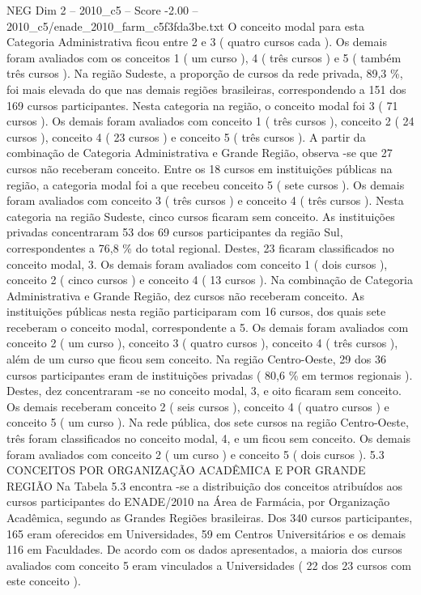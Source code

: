 \begin{textsample}{NEG Dim 2 – 2010\_c5 – Score -2.00 – 2010\_c5/enade\_2010\_farm\_c5f3fda3be.txt}
O conceito modal para esta Categoria Administrativa ficou entre 2 e 3 ( quatro cursos cada ).
Os demais foram avaliados com os conceitos 1 ( um curso ), 4 ( três cursos ) e 5 ( também três cursos ).
Na região Sudeste, a proporção de cursos da rede privada, 89,3 \%, foi mais elevada do que nas demais regiões brasileiras, correspondendo a 151 dos 169 cursos participantes.
Nesta categoria na região, o conceito modal foi 3 ( 71 cursos ).
Os demais foram avaliados com conceito 1 ( três cursos ), conceito 2 ( 24 cursos ), conceito 4 ( 23 cursos ) e conceito 5 ( três cursos ).
A partir da combinação de Categoria Administrativa e Grande Região, observa -se que 27 cursos não receberam conceito.
Entre os 18 cursos em instituições públicas na região, a categoria modal foi a que recebeu conceito 5 ( sete cursos ).
Os demais foram avaliados com conceito 3 ( três cursos ) e conceito 4 ( três cursos ).
Nesta categoria na região Sudeste, cinco cursos ficaram sem conceito.
As instituições privadas concentraram 53 dos 69 cursos participantes da região Sul, correspondentes a 76,8 \% do total regional.
Destes, 23 ficaram classificados no conceito modal, 3.
Os demais foram avaliados com conceito 1 ( dois cursos ), conceito 2 ( cinco cursos ) e conceito 4 ( 13 cursos ).
Na combinação de Categoria Administrativa e Grande Região, dez cursos não receberam conceito.
As instituições públicas nesta região participaram com 16 cursos, dos quais sete receberam o conceito modal, correspondente a 5.
Os demais foram avaliados com conceito 2 ( um curso ), conceito 3 ( quatro cursos ), conceito 4 ( três cursos ), além de um curso que ficou sem conceito.
Na região Centro-Oeste, 29 dos 36 cursos participantes eram de instituições privadas ( 80,6 \% em termos regionais ).
Destes, dez concentraram -se no conceito modal, 3, e oito ficaram sem conceito.
Os demais receberam conceito 2 ( seis cursos ), conceito 4 ( quatro cursos ) e conceito 5 ( um curso ).
Na rede pública, dos sete cursos na região Centro-Oeste, três foram classificados no conceito modal, 4, e um ficou sem conceito.
Os demais foram avaliados com conceito 2 ( um curso ) e conceito 5 ( dois cursos ). 5.3 CONCEITOS POR ORGANIZAÇÃO ACADÊMICA E POR GRANDE REGIÃO Na Tabela 5.3 encontra -se a distribuição dos conceitos atribuídos aos cursos participantes do ENADE/2010 na Área de Farmácia, por Organização Acadêmica, segundo as Grandes Regiões brasileiras.
Dos 340 cursos participantes, 165 eram oferecidos em Universidades, 59 em Centros Universitários e os demais 116 em Faculdades.
De acordo com os dados apresentados, a maioria dos cursos avaliados com conceito 5 eram vinculados a Universidades ( 22 dos 23 cursos com este conceito ).

\end{textsample}
